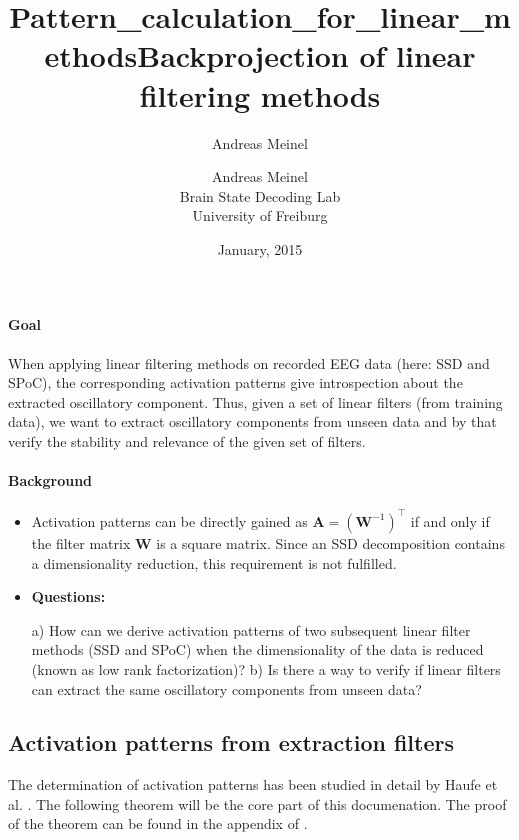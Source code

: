 \documentclass[11pt,a4paper]{article}
\author{Andreas Meinel}
\title{Pattern_calculation_for_linear_methods}
\renewcommand{\vec}[1]{\mathbf{#1}}
\begin{document}
\title{Backprojection of linear filtering methods}
\author{Andreas Meinel\\
Brain State Decoding Lab\\
University of Freiburg}  
\date{January, 2015}
\maketitle

\subsection*{}
\paragraph*{Goal} When applying linear filtering methods on recorded EEG data (here: SSD and SPoC), the corresponding activation patterns give introspection about the extracted oscillatory component. Thus, given a set of linear filters (from training data), we want to extract oscillatory components from unseen data and by that verify the stability and relevance of the given set of filters.
 
\paragraph*{Background} 
\begin{itemize}
\item Activation patterns can be directly gained as $\vec{A}=(\vec{W}^{-1})^\top$ if and only if the filter matrix $\vec{W}$ is a square matrix. Since an SSD decomposition contains a dimensionality reduction, this requirement is not fulfilled.
\item \textbf{Questions:}

\subitem a) How can we derive activation patterns of two subsequent linear filter methods (SSD and SPoC) when the dimensionality of the data is reduced (known as low rank factorization)? 
\subitem b) Is there a way to verify if linear filters can extract the same oscillatory components from unseen data?

\end{itemize}

\subsection*{Activation patterns from extraction filters}

The determination of activation patterns has been studied in detail by Haufe et al. \cite{haufe:2014}. The following theorem will be the core part of this documenation. The proof of the theorem can be found in the appendix of \cite{haufe:2014}. \\
\end{document}

